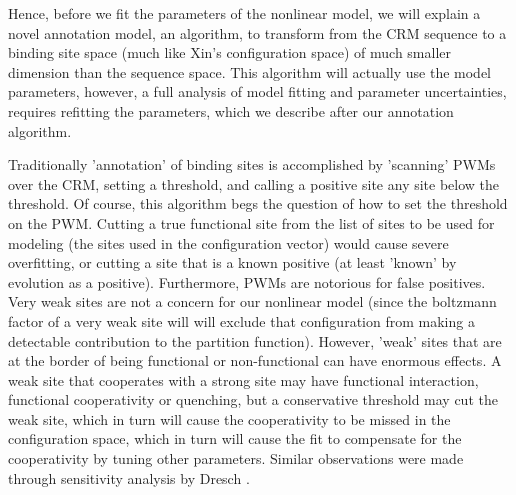 
Hence, before we fit the parameters of the nonlinear model, we will explain a novel annotation model, an algorithm, to transform from the CRM sequence to a binding site space (much like Xin's configuration space) of much smaller dimension than the sequence space.  This algorithm will actually use the model parameters, however, a full analysis of model fitting and parameter uncertainties, requires refitting the parameters, which we describe after our annotation algorithm.

  Traditionally 'annotation' of binding sites is accomplished by 'scanning' PWMs over the CRM, setting a threshold, and calling a positive site any site below the threshold.  Of course, this algorithm begs the question of how to set the threshold on the PWM.  Cutting a true functional site from the list of sites to be used for modeling (the sites used in the configuration vector) would cause severe overfitting, or cutting a site that is a known positive (at least 'known' by evolution as a positive).  Furthermore, PWMs are notorious for false positives.  Very weak sites are not a concern for our nonlinear model (since the boltzmann factor of a very weak site will will exclude that configuration from making a detectable contribution to the partition function).  However, 'weak' sites that are at the border of being functional or non-functional can have enormous effects.  A weak site that cooperates with a strong site may have functional interaction, functional cooperativity or quenching, but a conservative threshold may cut the weak site, which in turn will cause the cooperativity to be missed in the configuration space, which in turn will cause the fit to compensate for the cooperativity by tuning other parameters.  Similar observations were made through sensitivity analysis by Dresch \cite{pmid20969803}. 




